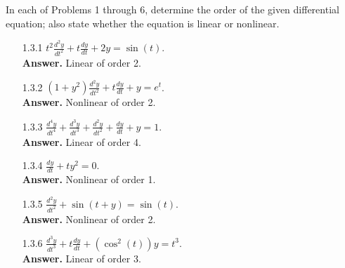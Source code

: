 In each of Problems 1 through 6, determine the order of the given differential
equation; also state whether the equation is linear or nonlinear.
\begin{enumerate}
   \item[1.3.1]   $t^2\frac{d^2y}{dt^2} + t\frac{dy}{dt} + 2y = \sin(t)$. \\

      \textbf{Answer.} Linear of order 2.
   \item[1.3.2]   $(1 + y^2)\frac{d^2y}{dt^2} + t\frac{dy}{dt} + y =e^t$. \\

      \textbf{Answer.} Nonlinear of order 2.
   \item[1.3.3]   $\frac{d^4y}{dt^4} + \frac{d^3y}{dt^3} + \frac{d^2y}{dt^2} +
                   \frac{dy}{dt} + y = 1$. \\

      \textbf{Answer.} Linear of order 4.
   \item[1.3.4]   $\frac{dy}{dt} + ty^2 = 0$. \\

      \textbf{Answer.} Nonlinear of order 1.
   \item[1.3.5]   $\frac{d^2y}{dt^2} + \sin(t + y) = \sin(t)$. \\

      \textbf{Answer.} Nonlinear of order 2.
   \item[1.3.6]   $\frac{d^3y}{dt^3} + t\frac{dy}{dt} + (\cos^2(t))y = t^3$. \\

      \textbf{Answer.} Linear of order 3.
\end{enumerate}

